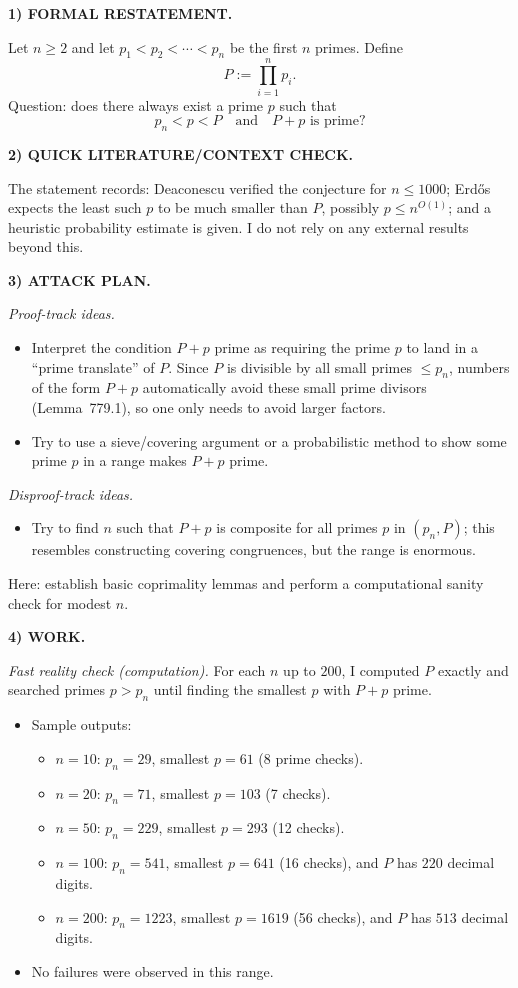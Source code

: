 \noindent\textbf{1) FORMAL RESTATEMENT.}

Let $n\ge 2$ and let $p_1<p_2<\cdots<p_n$ be the first $n$ primes. Define
\[
P:=\prod_{i=1}^n p_i.
\]
Question: does there always exist a prime $p$ such that
\[
p_n < p < P\quad\text{and}\quad P+p\text{ is prime}?
\]

\medskip
\noindent\textbf{2) QUICK LITERATURE/CONTEXT CHECK.}

The statement records: Deaconescu verified the conjecture for $n\le 1000$; Erd\H{o}s expects the least such $p$ to be much smaller than $P$, possibly $p\le n^{O(1)}$; and a heuristic probability estimate is given. I do not rely on any external results beyond this.

\medskip
\noindent\textbf{3) ATTACK PLAN.}

\emph{Proof-track ideas.}
\begin{itemize}
\item Interpret the condition $P+p$ prime as requiring the prime $p$ to land in a ``prime translate'' of $P$. Since $P$ is divisible by all small primes $\le p_n$, numbers of the form $P+p$ automatically avoid these small prime divisors (Lemma~779.1), so one only needs to avoid larger factors.
\item Try to use a sieve/covering argument or a probabilistic method to show some prime $p$ in a range makes $P+p$ prime.
\end{itemize}
\emph{Disproof-track ideas.}
\begin{itemize}
\item Try to find $n$ such that $P+p$ is composite for all primes $p$ in $(p_n,P)$; this resembles constructing covering congruences, but the range is enormous.
\end{itemize}
Here: establish basic coprimality lemmas and perform a computational sanity check for modest $n$.

\medskip
\noindent\textbf{4) WORK.}

\noindent\emph{Fast reality check (computation).}
For each $n$ up to $200$, I computed $P$ exactly and searched primes $p>p_n$ until finding the smallest $p$ with $P+p$ prime.
\begin{itemize}
\item Sample outputs:
\begin{itemize}
\item $n=10$: $p_n=29$, smallest $p=61$ (8 prime checks).
\item $n=20$: $p_n=71$, smallest $p=103$ (7 checks).
\item $n=50$: $p_n=229$, smallest $p=293$ (12 checks).
\item $n=100$: $p_n=541$, smallest $p=641$ (16 checks), and $P$ has $220$ decimal digits.
\item $n=200$: $p_n=1223$, smallest $p=1619$ (56 checks), and $P$ has $513$ decimal digits.
\end{itemize}
\item No failures were observed in this range.
\end{itemize}

